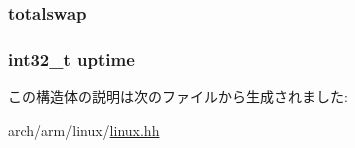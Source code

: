 \label{structArmLinux32_1_1tgt__sysinfo_aec5052a5ea8190b75fe495a9908ab9e9}
\hypertarget{structArmLinux32_1_1tgt__sysinfo_affcb72366c4cc75f904c0a7bf7c72a47}{
\subsubsection[{totalswap}]{ {\bf totalswap}}}
\label{structArmLinux32_1_1tgt__sysinfo_affcb72366c4cc75f904c0a7bf7c72a47}
\hypertarget{structArmLinux32_1_1tgt__sysinfo_acaed7912557581c7ea77bf8c1ae4ccf2}{
\subsubsection[{uptime}]{\setlength{\rightskip}{0pt plus 5cm}int32\_\-t {\bf uptime}}}
\label{structArmLinux32_1_1tgt__sysinfo_acaed7912557581c7ea77bf8c1ae4ccf2}


この構造体の説明は次のファイルから生成されました:\begin{DoxyCompactItemize}
\item 
arch/arm/linux/\hyperlink{arch_2arm_2linux_2linux_8hh}{linux.hh}\end{DoxyCompactItemize}
